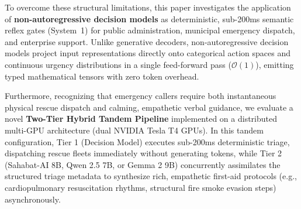 \documentclass[journal,compsoc]{IEEEtran}
\begin{document}
To overcome these structural limitations, this paper investigates the application of \textbf{non-autoregressive decision models} as deterministic, sub-200ms semantic reflex gates (System~1) for public administration, municipal emergency dispatch, and enterprise support. Unlike generative decoders, non-autoregressive decision models project input representations directly onto categorical action spaces and continuous urgency distributions in a single feed-forward pass ($\mathcal{O}(1)$), emitting typed mathematical tensors with zero token overhead.

Furthermore, recognizing that emergency callers require both instantaneous physical rescue dispatch and calming, empathetic verbal guidance, we evaluate a novel \textbf{Two-Tier Hybrid Tandem Pipeline} implemented on a distributed multi-GPU architecture (dual NVIDIA Tesla T4 GPUs). In this tandem configuration, Tier 1 (Decision Model) executes sub-200ms deterministic triage, dispatching rescue fleets immediately without generating tokens, while Tier 2 (Sahabat-AI 8B, Qwen 2.5 7B, or Gemma 2 9B) concurrently assimilates the structured triage metadata to synthesize rich, empathetic first-aid protocols (e.g., cardiopulmonary resuscitation rhythms, structural fire smoke evasion steps) asynchronously.
\end{document}

